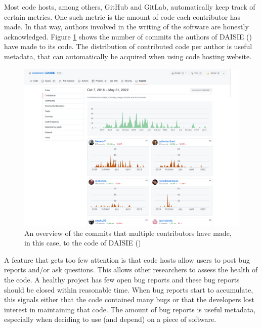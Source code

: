 Most code hosts, among others, GitHub and GitLab,
automatically keep track of certain metrics.
One such metric is the amount of code each contributor has made.
In that way, authors involved in the writing of the software
are honestly acknowledged. Figure \ref{fig:daisie_contributors}
shows the number of commits the authors of DAISIE (\cite{etienne2020daisie})
have made to its code.
The distribution of contributed code per author 
is useful metadata, that can automatically
be acquired when using code hosting website.

\begin{figure}[!htbp]
  \centering
  \includegraphics[width=\linewidth]{daisie_contributors.png}
  \caption{
    An overview of the commits that multiple contributors have
    made, in this case, to the code of DAISIE (\cite{etienne2020daisie})
  }
  \label{fig:daisie_contributors}
\end{figure}



A feature that gets too few attention is that code hosts
allow users to post bug reports and/or ask questions.
This allows other researchers to assess the health
of the code.
A healthy project has few open bug reports
and these bug reports should be closed within reasonable time.
When bug reports start to accumulate, this
signals either that the code contained many bugs or that
the developers lost interest in maintaining that code.
The amount of bug reports is useful metadata, 
especially when deciding to use (and depend) on a piece of software.

